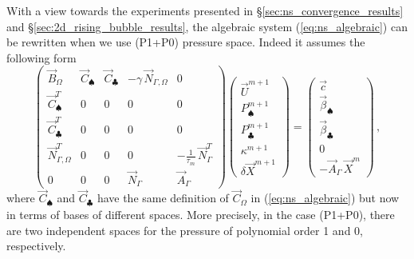 \documentclass[a4paper,12pt,onecolumn]{article}
\newcommand{\NbulkT}{\vec{N}_{\Gamma,\Omega}^T}
\newcommand{\Nbulk}{\vec{N}_{\Gamma,\Omega}}
\begin{document}
With a view towards the experiments presented in
\S\ref{sec:ns_convergence_results} and \S\ref{sec:2d_rising_bubble_results},
the algebraic system (\ref{eq:ns_algebraic}) can be rewritten when we use
(P1+P0) pressure space. Indeed it assumes the following form
\begin{equation}
\begin{pmatrix}
\vec B_\Omega & \vec C_{\spadesuit} & \vec C_{\clubsuit} & -\gamma\,\Nbulk & 0\\
\vec C^T_{\spadesuit} & 0 & 0 & 0 & 0 \\
\vec C^T_{\clubsuit} & 0 & 0 & 0 & 0 \\
\NbulkT & 0 & 0 & 0 & -\frac1{\tau_m}\,\vec N_\Gamma^T \\
0 & 0 & 0 & \vec N_\Gamma & \vec A_\Gamma
\end{pmatrix}
\begin{pmatrix}
\vec U^{m+1} \\
P^{m+1}_\spadesuit \\
P^{m+1}_\clubsuit \\
\kappa^{m+1} \\
\delta\vec X^{m+1}
\end{pmatrix}
=
\begin{pmatrix}
\vec c \\
\vec \beta_\spadesuit \\
\vec \beta_\clubsuit \\
0 \\
-\vec A_\Gamma\,\vec X^m
\end{pmatrix} \,,
\label{eq:ns_algebraic_extended}
\end{equation}
where $\vec C_{\spadesuit}$ and $\vec C_{\clubsuit}$ have the same definition
of $\vec C_\Omega$ in (\ref{eq:ns_algebraic}) but now in terms of bases of
different spaces. More precisely, in the case (P1+P0), there are two
independent spaces for the pressure of polynomial order 1 and 0, respectively.
\end{document}

